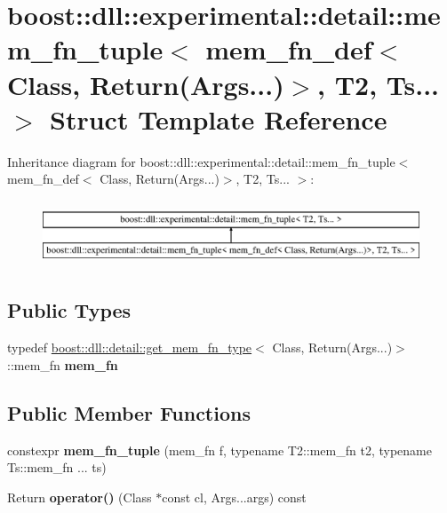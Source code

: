 \hypertarget{a01536}{}\section{boost\+:\+:dll\+:\+:experimental\+:\+:detail\+:\+:mem\+\_\+fn\+\_\+tuple$<$ mem\+\_\+fn\+\_\+def$<$ Class, Return(Args...)$>$, T2, Ts... $>$ Struct Template Reference}
\label{a01536}
Inheritance diagram for boost\+:\+:dll\+:\+:experimental\+:\+:detail\+:\+:mem\+\_\+fn\+\_\+tuple$<$ mem\+\_\+fn\+\_\+def$<$ Class, Return(Args...)$>$, T2, Ts... $>$\+:\begin{figure}[H]
\begin{center}
\leavevmode
\includegraphics[height=2.000000cm]{a01536}
\end{center}
\end{figure}
\subsection*{Public Types}
\begin{DoxyCompactItemize}
\item 
\mbox{\label{a01536_a8a4a6f055aa61784e85620d0e4ab854b}} 
typedef \hyperlink{a01412}{boost\+::dll\+::detail\+::get\+\_\+mem\+\_\+fn\+\_\+type}$<$ Class, Return(Args...)$>$\+::mem\+\_\+fn {\bfseries mem\+\_\+fn}
\end{DoxyCompactItemize}
\subsection*{Public Member Functions}
\begin{DoxyCompactItemize}
\item 
\mbox{\label{a01536_a4db63f89efe2ac6d062f372cd0fc5b40}} 
constexpr {\bfseries mem\+\_\+fn\+\_\+tuple} (mem\+\_\+fn f, typename T2\+::mem\+\_\+fn t2, typename Ts\+::mem\+\_\+fn ... ts)
\item 
\mbox{\label{a01536_a755036d504bf3e079a9da6043efb822a}} 
Return {\bfseries operator()} (Class $\ast$const cl, Args...\+args) const
\end{DoxyCompactItemize}
